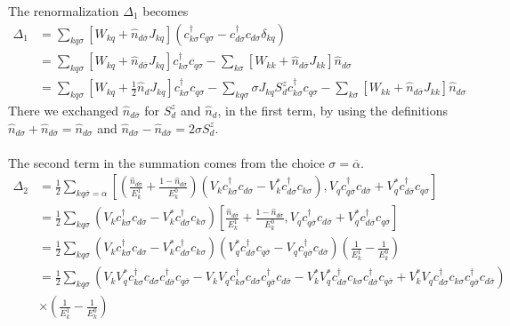 \documentclass[twoside]{report}
\numberwithin{equation}{section}
\begin{document}
The renormalization \(\Delta_1\) becomes
\begin{equation}\begin{aligned}
	\Delta_1 &=\sum_{kq\sigma}\left[W_{kq} + \hat n_{d\overline\sigma}J_{kq}\right] \left(c^\dagger_{k\sigma}c_{q\sigma} - c^\dagger_{d\sigma}c_{d\sigma}\delta_{kq}\right)\\
		 &=\sum_{kq\sigma}\left[W_{kq} + \hat n_{d\overline\sigma}J_{kq}\right]c^\dagger_{k\sigma}c_{q\sigma} - \sum_{k\sigma}\left[W_{kk} + \hat n_{d\overline\sigma}J_{kk}\right]\hat n_{d\sigma}\\
		 &=\sum_{kq\sigma}\left[W_{kq} + \frac{1}{2} \hat n_d J_{kq}\right]c^\dagger_{k\sigma}c_{q\sigma} - \sum_{kq\sigma}\sigma J_{kq} S_d^z c^\dagger_{k\sigma}c_{q\sigma}- \sum_{k\sigma}\left[W_{kk} + \hat n_{d\overline\sigma}J_{kk}\right]\hat n_{d\sigma}
\end{aligned}\end{equation}
There we exchanged \(\hat n_{d\overline\sigma}\) for \(S_d^z\) and \(\hat n_d\), in the first term, by using the definitions \(\hat n_{d\sigma} + \hat n_{d\overline\sigma} = \hat n_{d\sigma}\) and \(\hat n_{d\sigma} - \hat n_{d\overline\sigma} = 2\sigma S_d^z\).
\\\\The second term in the summation comes from the choice \(\sigma = \overline\alpha\).
\begin{equation}\begin{aligned}
	\Delta_2 &= \frac{1}{2}\sum_{kq\overline\sigma=\alpha}\left[\left(\frac{\hat n_{d\overline\sigma}}{E_k^1} + \frac{1 - \hat n_{d\overline\sigma}}{E_k^0}\right)\left(V_k c^\dagger_{k\sigma}c_{d\sigma} - V^*_k c^\dagger_{d\sigma}c_{k\sigma}\right),V_q c^\dagger_{q\overline\sigma}c_{d\overline\sigma} + V_q^* c^\dagger_{d\overline\sigma}c_{q\overline\sigma}\right]\\
		 &= \frac{1}{2}\sum_{kq\sigma}\left(V_k c^\dagger_{k\sigma}c_{d\sigma} - V^*_k c^\dagger_{d\sigma}c_{k\sigma}\right)\left[\frac{\hat n_{d\overline\sigma}}{E_k^1} + \frac{1 - \hat n_{d\overline\sigma}}{E_k^0},V_q c^\dagger_{q\overline\sigma}c_{d\overline\sigma} + V_q^* c^\dagger_{d\overline\sigma}c_{q\overline\sigma}\right]\\
		 &= \frac{1}{2}\sum_{kq\sigma}\left(V_k c^\dagger_{k\sigma}c_{d\sigma} - V^*_k c^\dagger_{d\sigma}c_{k\sigma}\right)\left(V_q^*c^\dagger_{d\overline\sigma}c_{q\overline\sigma} - V_q c^\dagger_{q\overline\sigma}c_{d\overline\sigma}\right)\left(\frac{1}{E_k^1} - \frac{1}{E_k^0}\right)\\
		 &= \frac{1}{2}\sum_{kq\sigma}\left(V_k V_q^* c^\dagger_{k\sigma}c_{d\sigma} c^\dagger_{d\overline\sigma}c_{q\overline\sigma} - V_k V_q c^\dagger_{k\sigma}c_{d\sigma} c^\dagger_{q\overline\sigma}c_{d\overline\sigma} - V^*_k V_q^* c^\dagger_{d\sigma}c_{k\sigma} c^\dagger_{d\overline\sigma}c_{q\overline\sigma} + V^*_k V_q c^\dagger_{d\sigma}c_{k\sigma} c^\dagger_{q\overline\sigma}c_{d\overline\sigma}\right)\\
		 &\times\left(\frac{1}{E_k^1} - \frac{1}{E_k^0}\right)\\
\end{aligned}\end{equation}
\end{document}
